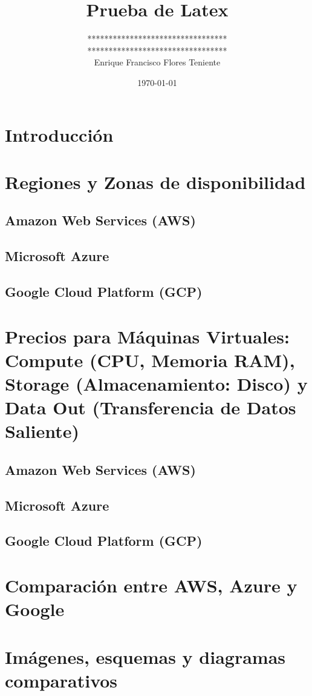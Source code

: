 \documentclass{article}
\title{Prueba de Latex}
\date{\today}
\author{
    ********************************* \\
    ********************************* \\
    Enrique Francisco Flores Teniente
  }
\affil{UTEC}
\begin{document}
\maketitle

\section{Introducción}



\section{Regiones y Zonas de disponibilidad}
  \subsection{Amazon Web Services (AWS)}
  \subsection{Microsoft Azure}
  \subsection{Google Cloud Platform (GCP)}

\section{Precios para Máquinas Virtuales: Compute (CPU, Memoria RAM), Storage (Almacenamiento: Disco) y Data Out (Transferencia de Datos Saliente)}
  \subsection{Amazon Web Services (AWS)}
  \subsection{Microsoft Azure}
  \subsection{Google Cloud Platform (GCP)}

\section{Comparación entre AWS, Azure y Google}

\section{Imágenes, esquemas y diagramas comparativos}


\printbibliography
\end{document}
